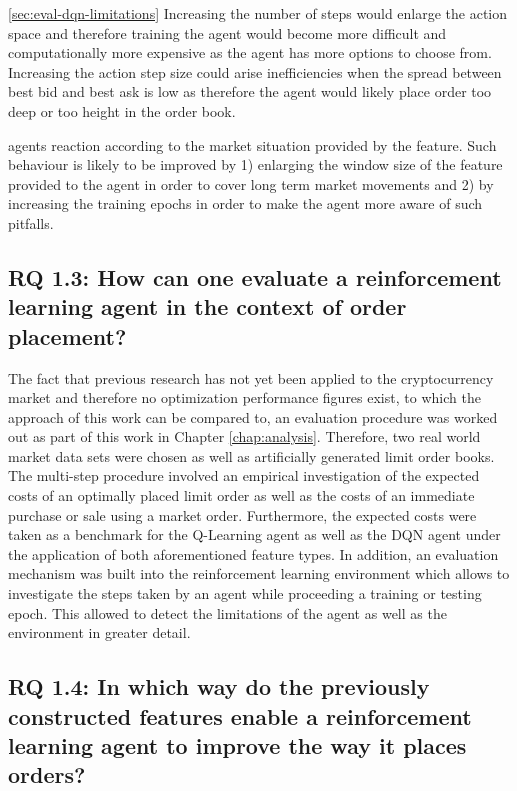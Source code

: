 \ref{sec:eval-dqn-limitations}
Increasing the number of steps would enlarge the action space and therefore training the agent
would become more difficult and computationally more expensive as the agent has more options to choose
from. Increasing the action step size could arise inefficiencies when the spread between best bid and best ask
is low as therefore the agent would likely place order too deep or too height in the order book.

agents reaction according to the market situation provided by the feature.
Such behaviour is likely to be improved by 1) enlarging the window size of the feature provided to the agent in order to cover long term market movements and 2) by increasing the training epochs in order to make the agent more aware of such pitfalls.


\subsection{RQ 1.3: How can one evaluate a reinforcement learning agent in the context of order placement?}

    The fact that previous research has not yet been applied to the cryptocurrency market and therefore no optimization performance figures exist, to which the approach of this work can be compared to, an evaluation procedure was worked out as part of this work in Chapter \ref{chap:analysis}.
    Therefore, two real world market data sets were chosen as well as artificially generated limit order books.
    The multi-step procedure involved an empirical investigation of the expected costs of an optimally placed limit order as well as the costs of an immediate purchase or sale using a market order.
    Furthermore, the expected costs were taken as a benchmark for the Q-Learning agent as well as the DQN agent under the application of both aforementioned feature types.
    In addition, an evaluation mechanism was built into the reinforcement learning environment which allows to investigate the steps taken by an agent while proceeding a training or testing epoch.
    This allowed to detect the limitations of the agent as well as the environment in greater detail.
    
\subsection{RQ 1.4: In which way do the previously constructed features enable a reinforcement learning agent to improve the way it places orders?}

